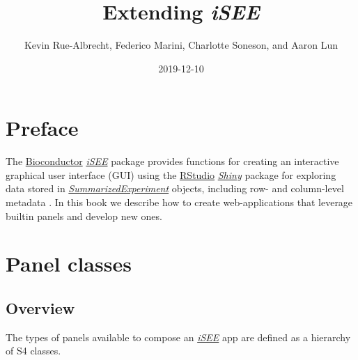 \documentclass[]{book}
\title{Extending \emph{iSEE}}
\author{Kevin Rue-Albrecht, Federico Marini, Charlotte Soneson, and Aaron Lun}
\date{2019-12-10}
\begin{document}
\maketitle

{
\setcounter{tocdepth}{1}
\tableofcontents
}
\hypertarget{preface}{%
\chapter*{Preface}\label{preface}}

The \href{https://bioconductor.org/}{Bioconductor} \emph{\href{https://bioconductor.org/packages/3.11/iSEE}{iSEE}} package provides functions for creating an interactive graphical user interface (GUI) using the \href{https://rstudio.com/}{RStudio} \emph{\href{https://CRAN.R-project.org/package=Shiny}{Shiny}} package for exploring data stored in \emph{\href{https://bioconductor.org/packages/3.11/SummarizedExperiment}{SummarizedExperiment}} objects, including row- and column-level metadata \citep{rue2018isee}.
In this book we describe how to create web-applications that leverage builtin panels and develop new ones.

\hypertarget{panels}{%
\chapter{Panel classes}\label{panels}}

\hypertarget{overview}{%
\section{Overview}\label{overview}}

The types of panels available to compose an \emph{\href{https://bioconductor.org/packages/3.11/iSEE}{iSEE}} app are defined as a hierarchy of S4 classes.
\end{document}
